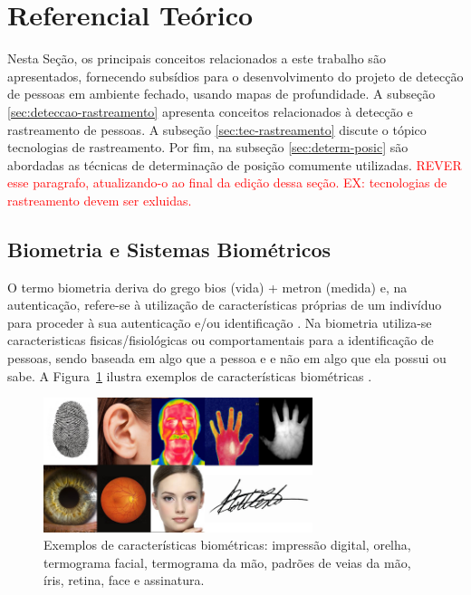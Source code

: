 \section{Referencial Teórico}\label{sec:referencial-teorico}

Nesta Seção, os principais conceitos relacionados a este trabalho são apresentados, fornecendo subsídios para o desenvolvimento do projeto de detecção de pessoas em ambiente fechado, usando mapas de profundidade. A subseção \ref{sec:deteccao-rastreamento} apresenta conceitos relacionados à detecção e rastreamento de pessoas. A subseção \ref{sec:tec-rastreamento} discute o tópico tecnologias de rastreamento. Por fim, na subseção \ref{sec:determ-posic} são abordadas as técnicas de determinação de posição comumente utilizadas. \textcolor{red}{REVER esse paragrafo, atualizando-o ao final da edição dessa seção. EX: tecnologias de rastreamento devem ser exluidas.}


\subsection{Biometria e Sistemas Biométricos}\label{sec:biometria}
O termo biometria deriva do grego bios (vida) + metron (medida) e, na autenticação, refere-se à utilização de características próprias de um indivíduo para proceder à sua autenticação e/ou identificação \cite{magalhaes2003biometria}. Na biometria utiliza-se caracteristicas fisicas/fisiológicas ou comportamentais para a identificação de pessoas, sendo baseada em algo que a pessoa e e não em algo que ela possui ou sabe. A Figura~\ref{fig:biometria} ilustra exemplos de características biométricas \cite{cardia2015avaliaccao}.

\begin{figure}[ht]
\centering
    \includegraphics[resolution=300,width=0.7\textwidth,natwidth=610,natheight=642]{images/biometria.png}
    \caption{Exemplos de características biométricas: impressão digital, orelha, termograma facial, termograma da mão, padrões de veias da mão, íris, retina, face e assinatura.}
    \label{fig:biometria}
\end{figure}

